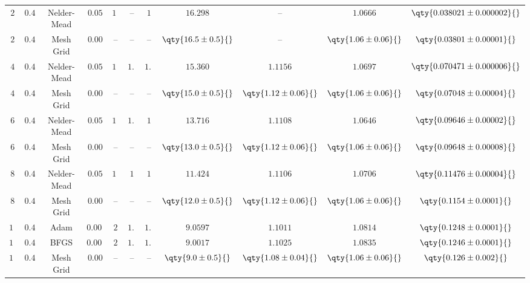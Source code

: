 \begin{tabular}{cc|ccccc|cccc}
    \rowcolor{LightCyan}
    $2$ & $0.40$ & Nelder-Mead & $0.05$ & $16$ & -- & $1$ & $16.298$ & -- & $1.0666$ & $\qty{0.038021 \pm 0.000002}{}$ \\
    $2$ & $0.40$ & Mesh Grid & $0.00$ & -- & -- & -- & $\qty{16.5 \pm 0.5}{}$ & -- & $\qty{1.06 \pm 0.06}{}$ & $\qty{0.03801 \pm 0.00001}{}$ \\
    \rowcolor{LightCyan}
    $4$ & $0.40$ & Nelder-Mead & $0.05$ & $16$ & $1.1$ & $1.1$ & $15.360$ & $1.1156$ & $1.0697$ & $\qty{0.070471 \pm 0.000006}{}$ \\
    $4$ & $0.40$ & Mesh Grid & $0.00$ & -- & -- & -- & $\qty{15.0 \pm 0.5}{}$ & $\qty{1.12 \pm 0.06}{}$ & $\qty{1.06 \pm 0.06}{}$ & $\qty{0.07048 \pm 0.00004}{}$ \\
    \rowcolor{LightCyan}
    $6$ & $0.40$ & Nelder-Mead & $0.05$ & $13$ & $1.1$ & $1$ & $13.716$ & $1.1108$ & $1.0646$ & $\qty{0.09646 \pm 0.00002}{}$ \\
    $6$ & $0.40$ & Mesh Grid & $0.00$ & -- & -- & -- & $\qty{13.0 \pm 0.5}{}$ & $\qty{1.12 \pm 0.06}{}$ & $\qty{1.06 \pm 0.06}{}$ & $\qty{0.09648 \pm 0.00008}{}$ \\
    \rowcolor{LightCyan}
    $8$ & $0.40$ & Nelder-Mead & $0.05$ & $16$ & $1$ & $1$ & $11.424$ & $1.1106$ & $1.0706$ & $\qty{0.11476 \pm 0.00004}{}$ \\
    $8$ & $0.40$ & Mesh Grid & $0.00$ & -- & -- & -- & $\qty{12.0 \pm 0.5}{}$ & $\qty{1.12 \pm 0.06}{}$ & $\qty{1.06 \pm 0.06}{}$ & $\qty{0.1154 \pm 0.0001}{}$ \\
    $12$\tnote{$*$} & $0.40$ & Adam & $0.0005$ & $2$ & $1.1$ & $1.1$ & $9.0597$ & $1.1011$ & $1.0814$ & $\qty{0.1248 \pm 0.0001}{}$ \\
    \rowcolor{LightCyan}
    $12$\tnote{$*$} & $0.40$ & BFGS & $0.0005$ & $2$ & $1.1$ & $1.1$ & $9.0017$ & $1.1025$ & $1.0835$ & $\qty{0.1246 \pm 0.0001}{}$ \\
    $12$\tnote{$*$} & $0.40$ & Mesh Grid & $0.00$ & -- & -- & -- & $\qty{9.0 \pm 0.5}{}$ & $\qty{1.08 \pm 0.04}{}$ & $\qty{1.06 \pm 0.06}{}$ & $\qty{0.126 \pm 0.002}{}$ \\ \hline


\end{tabular}
